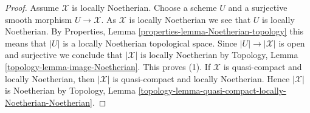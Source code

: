 \documentclass[10pt,a4paper]{amsart}
\theoremstyle{plain}
\theoremstyle{definition}
\theoremstyle{remark}
\numberwithin{equation}{subsection}
\begin{document}
\begin{proof}
Assume $\mathcal{X}$ is locally Noetherian.
Choose a scheme $U$ and a surjective smooth morphism
$U \to \mathcal{X}$. As $\mathcal{X}$ is locally Noetherian
we see that $U$ is locally Noetherian. By
Properties, Lemma \ref{properties-lemma-Noetherian-topology}
this means that $|U|$ is a locally Noetherian topological space.
Since $|U| \to |\mathcal{X}|$ is open and surjective we conclude that
$|\mathcal{X}|$ is locally Noetherian by
Topology, Lemma \ref{topology-lemma-image-Noetherian}.
This proves (1). If $\mathcal{X}$ is quasi-compact and locally Noetherian,
then $|\mathcal{X}|$ is quasi-compact and locally Noetherian. Hence
$|\mathcal{X}|$ is Noetherian by Topology, Lemma
\ref{topology-lemma-quasi-compact-locally-Noetherian-Noetherian}.
\end{proof}
\end{document}
